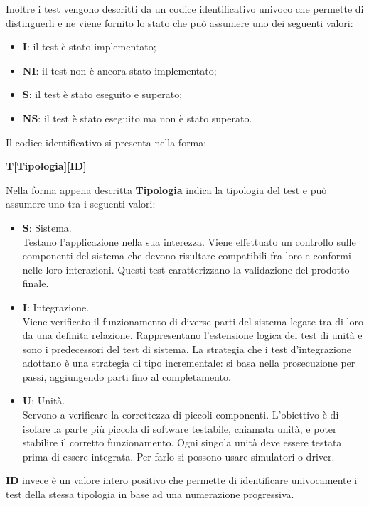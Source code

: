 Inoltre i test vengono descritti da un codice identificativo univoco che permette di distinguerli e ne viene fornito lo stato che può
assumere uno dei seguenti valori:
\begin{itemize}
    \item \textbf{I}: il test è stato implementato;
    \item \textbf{NI}: il test non è ancora stato implementato;
    \item \textbf{S}: il test è stato eseguito e superato;
    \item \textbf{NS}: il test è stato eseguito ma non è stato superato.
\end{itemize}

Il codice identificativo si presenta nella forma:
\begin{center}
    \textbf{T[Tipologia][ID]}
\end{center}
Nella forma appena descritta \textbf{Tipologia} indica la tipologia del test e può assumere uno tra i seguenti valori:
\begin{itemize}
	\item \textbf{S}: Sistema. \\ Testano l’applicazione nella sua interezza. Viene effettuato un controllo sulle componenti del sistema che devono risultare compatibili fra loro e conformi nelle loro interazioni.
    Questi test caratterizzano la validazione del prodotto finale.
	\item \textbf{I}: Integrazione. \\ Viene verificato il funzionamento di diverse parti del sistema legate tra di loro da una definita relazione.
    Rappresentano l’estensione logica dei test di unità e sono i predecessori del test di sistema. La strategia che i test d’integrazione adottano è una strategia di tipo incrementale: si basa nella prosecuzione per passi, aggiungendo parti fino al completamento.
	\item \textbf{U}: Unità. \\ Servono a verificare la correttezza di piccoli componenti. L’obiettivo è di isolare la parte più piccola di software testabile, chiamata unità, e poter stabilire il corretto funzionamento.
    Ogni singola unità deve essere testata prima di essere integrata. Per farlo si possono usare simulatori o driver.

\end{itemize}

\textbf{ID} invece è un valore intero positivo che permette di identificare univocamente i test della stessa tipologia in base ad una
numerazione progressiva.

